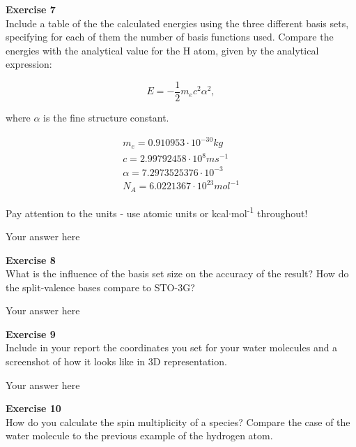 \documentclass{article}
\begin{document}
\begin{mdframed}
\textbf{Exercise 7}\\
Include a table of the the calculated energies using the three different basis sets, specifying for each of them the number of basis functions used. Compare the energies with the analytical value for the H atom, given by the analytical expression:

\begin{equation}
E = -\frac{1}{2} m_e c^2\alpha^2,
\end{equation}

where $\alpha$ is the fine structure constant.

\begin{equation}
\begin{align}
m_e = 0.910953\cdot10^{-30} kg\\
c = 2.99792458\cdot10^8 m s^{-1}\\
\alpha = 7.2973525376\cdot10^{-3}\\
N_A = 6.0221367\cdot10^{23}mol^{-1}
\end{align}
\end{equation}

Pay attention to the units - use atomic units or kcal$\cdot$mol\textsuperscript{-1} throughout!
\end{mdframed}

Your answer here

\begin{mdframed}
\textbf{Exercise 8}\\
What is the influence of the basis set size on the accuracy of the result? How do the split-valence bases compare to STO-3G?
\end{mdframed}

Your answer here

\begin{mdframed}
\textbf{Exercise 9}\\
Include in your report the coordinates you set for your water molecules and a screenshot of how it looks like in 3D representation.
\end{mdframed}

Your answer here

\begin{mdframed}
\textbf{Exercise 10}\\
How do you calculate the spin multiplicity of a species? Compare the case of the water molecule to the previous example of the hydrogen atom.
\end{mdframed}
\end{document}
